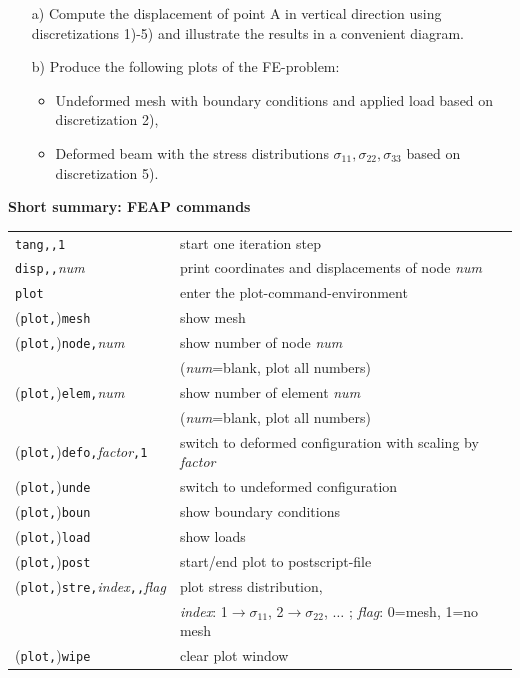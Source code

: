 \documentclass[12pt,twoside]{article}
\begin{document}
\begin{itemize}
  \item[a)] Compute the displacement of point {\sf A} in vertical direction using 
discretizations 1)-5) and illustrate the results
in a convenient diagram.
  \item[b)] Produce the following plots of the FE-problem:
  \begin{itemize}
    \item Undeformed mesh with boundary conditions and applied load based on discretization 2),
    \item Deformed beam with the stress distributions $\sigma_{11}, \sigma_{22}, \sigma_{33}$
based on discretization 5).
  \end{itemize}
\end{itemize}

\bigskip

{\bf Short summary: FEAP commands}

\begin{tabular}{ll}
\verb/tang,,1/ & start one iteration step\\
\verb/disp,,/{\sl num} & print coordinates and displacements of node {\sl num}\\
\verb/plot/    & enter the plot-command-environment\\
(\verb/plot,/)\verb/mesh/    & show mesh\\
(\verb/plot,/)\verb/node,/{\sl num}    & show number of node {\sl num}\\
& ({\sl num}=blank, plot all numbers)\\
(\verb/plot,/)\verb/elem,/{\sl num}    & show number of element {\sl num}\\
& ({\sl num}=blank, plot all numbers)\\
(\verb/plot,/)\verb/defo,/{\sl factor}\verb/,1/ & switch to deformed configuration with scaling by {\sl factor}\\
(\verb/plot,/)\verb/unde/    & switch to undeformed configuration\\
(\verb/plot,/)\verb/boun/    & show boundary conditions\\
(\verb/plot,/)\verb/load/    & show loads\\
(\verb/plot,/)\verb/post/    & start/end plot to postscript-file\\
(\verb/plot,/)\verb/stre,/{\sl index}\verb/,,/{\sl flag} & plot stress distribution,\\
& {\sl index}: 1$\rightarrow\sigma_{11}$, 2$\rightarrow\sigma_{22}$, $\ldots$ ;
{\sl flag}: 0=mesh, 1=no mesh\\
(\verb/plot,/)\verb/wipe/    & clear plot window
\end{tabular}\medskip
\end{document}
